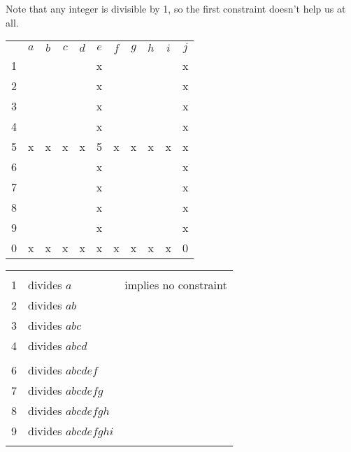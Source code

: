 Note that any integer is divisible by 1, so the first constraint doesn't help us at all.
\begin{center}
\begin{tabular}{ccccccccccc}
			&	$a$	&	$b$	&	$c$	&	$d$	&	$e$	&	$f$	&	$g$	&	$h$	&	$i$	&	$j$	\\
	1		&		&		&		&		&	x	&		&		&		&		&	x	\\
	2		&		&		&		&		&	x	&		&		&		&		&	x	\\
	3		&		&		&		&		&	x	&		&		&		&		&	x	\\
	4		&		&		&		&		&	x	&		&		&		&		&	x	\\
	5		&	x	&	x	&	x	&	x	&	5	&	x	&	x	&	x	&	x	&	x	\\
	6		&		&		&		&		&	x	&		&		&		&		&	x	\\
	7		&		&		&		&		&	x	&		&		&		&		&	x	\\
	8		&		&		&		&		&	x	&		&		&		&		&	x	\\
	9		&		&		&		&		&	x	&		&		&		&		&	x	\\
	0		&	x	&	x	&	x	&	x	&	x	&	x	&	x	&	x	&	x	&	0	\\
\end{tabular}
\hspace{1cm}\vline\hspace{1cm}
\begin{tabular}{rll}
	& 		\\
	1	&	divides $a$					& implies no constraint	\\
	2	&	divides $ab$					\\
	3	&	divides $abc$					\\
	4	&	divides $abcd$					\\
		&	\\
	6	&	divides $abcdef$				\\
	7	&	divides $abcdefg$				\\
	8	&	divides $abcdefgh$				\\
	9	&	divides $abcdefghi$				\\
		&	
\end{tabular}
\end{center}


